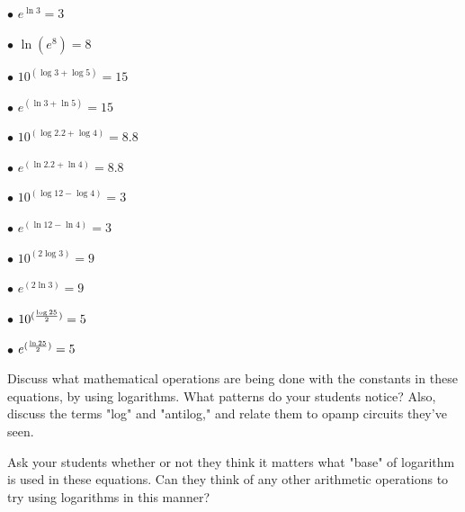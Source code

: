 \vskip 10pt

\item{$\bullet$} $e^{\ln 3} = 3$ 
\item{$\bullet$} $\ln (e^8) = 8$

\vskip 10pt

\item{$\bullet$} $10^{(\log 3 + \log 5)} = 15$
\item{$\bullet$} $e^{(\ln 3 + \ln 5)} = 15$

\vskip 10pt

\item{$\bullet$} $10^{(\log 2.2 + \log 4)} = 8.8$
\item{$\bullet$} $e^{(\ln 2.2 + \ln 4)} = 8.8$

\vskip 10pt

\item{$\bullet$} $10^{(\log 12 - \log 4)} = 3$
\item{$\bullet$} $e^{(\ln 12 - \ln 4)} = 3$

\vskip 10pt

\item{$\bullet$} $10^{(2 \log 3)} = 9$
\item{$\bullet$} $e^{(2 \ln 3)} = 9$

\vskip 10pt

\item{$\bullet$} $10^{({{\log 25} \over 2})} = 5$
\item{$\bullet$} $e^{({{\ln 25} \over 2})} = 5$
\medskip







Discuss what mathematical operations are being done with the constants in these equations, by using logarithms.  What patterns do your students notice?  Also, discuss the terms "log" and "antilog," and relate them to opamp circuits they've seen.

Ask your students whether or not they think it matters what "base" of logarithm is used in these equations.  Can they think of any other arithmetic operations to try using logarithms in this manner?




